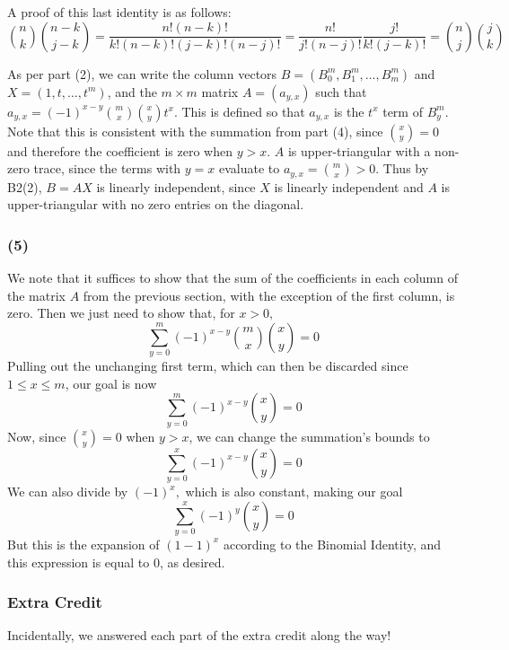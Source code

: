 \documentclass{article}
\begin{document}
A proof of this last identity is as follows:
\[\binom{n}{k}\binom{n-k}{j-k} = \frac{n!(n-k)!}{k!(n-k)!(j-k)!(n-j)!}
=\frac{n!}{j!(n-j)!}\frac{j!}{k!(j-k)!} = \binom{n}{j}\binom{j}{k}\]

\medskip
As per part (2), we can write the column vectors
$B = \displaystyle{(B_0^m, B_1^m,\dots,B_m^m)}$ and $X = (1,t,\dots,t^m)$,
and the $m\times m$ matrix
$A = (a_{y,x})$ such that $a_{y,x} = (-1)^{x - y} \binom{m}{x}\binom{x}{y}t^x$.
This is defined so that $a_{y,x}$ is the $t^x$ term of $B^m_y$.
Note that this is consistent with the summation from part (4), since 
$\binom{x}{y} = 0$ and therefore the coefficient is zero when $y > x$. 
$A$ is upper-triangular with a non-zero trace, since the terms with $y=x$
evaluate to $a_{y,x} = \binom{m}{x} > 0$.
Thus by B2(2), $B = AX$ is linearly independent, since $X$ is linearly
independent and $A$ is upper-triangular with no zero entries on the diagonal.

\subsubsection{(5)}
We note that it suffices to show that the sum of the coefficients in each column
of the matrix $A$ from the previous section, with the exception of the first
column, is zero.
Then we just need to show that, for $x > 0,$
\[\sum_{y=0}^m (-1)^{x-y} \binom{m}{x}\binom{x}{y} = 0\]
Pulling out the unchanging first term, which can then be discarded since
$1 \leq x \leq m$, our goal is now
\[\sum_{y=0}^m (-1)^{x-y}\binom{x}{y} = 0\]
Now, since $\binom{x}{y} = 0$ when $y > x$, we can change the summation's bounds
to
\[\sum_{y=0}^x (-1)^{x-y}\binom{x}{y} = 0\]
We can also divide by $(-1)^x,$ which is also constant, making our goal
\[\sum_{y=0}^x(-1)^y \binom{x}{y} = 0\]
But this is the expansion of $(1 - 1)^x$ according to the Binomial Identity,
and this expression is equal to $0$, as desired.

\subsubsection{Extra Credit}
Incidentally, we answered each part of the extra credit along the way!
\end{document}
